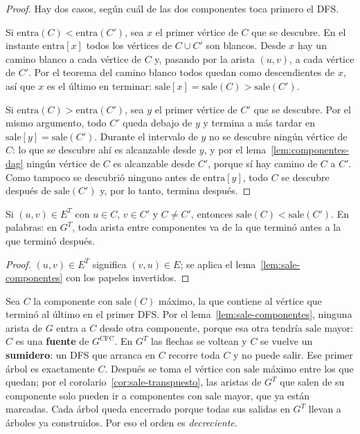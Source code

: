 \documentclass[11pt,letterpaper]{article}
\begin{document}
\begin{proof}
  Hay dos casos, según cuál de las dos componentes toca primero el
  DFS.

  Si $\text{entra}(C) < \text{entra}(C')$, sea $x$ el primer vértice
  de $C$ que se descubre. En el instante $\text{entra}[x]$ todos los
  vértices de $C \cup C'$ son blancos. Desde $x$ hay un camino blanco a
  cada vértice de $C$ y, pasando por la arista $(u, v)$, a cada vértice
  de $C'$. Por el teorema del camino blanco todos quedan como
  descendientes de $x$, así que $x$ es el último en terminar:
  $\text{sale}[x] = \text{sale}(C) > \text{sale}(C')$.

  Si $\text{entra}(C) > \text{entra}(C')$, sea $y$ el primer vértice
  de $C'$ que se descubre. Por el mismo argumento, todo $C'$ queda
  debajo de $y$ y termina a más tardar en $\text{sale}[y] =
  \text{sale}(C')$. Durante el intervalo de $y$ no se descubre ningún
  vértice de $C$: lo que se descubre ahí es alcanzable desde $y$, y por
  el lema~\ref{lem:componentes-dag} ningún vértice de $C$ es
  alcanzable desde $C'$, porque sí hay camino de $C$ a $C'$. Como
  tampoco se descubrió ninguno antes de $\text{entra}[y]$, todo $C$ se
  descubre después de $\text{sale}(C')$ y, por lo tanto, termina
  después.
\end{proof}

\begin{corolario}
  \label{cor:sale-transpuesto}
  Si $(u, v) \in E^T$ con $u \in C$, $v \in C'$ y $C \neq C'$,
  entonces $\text{sale}(C) < \text{sale}(C')$. En palabras: en $G^T$,
  toda arista entre componentes va de la que terminó antes a la que
  terminó después.
\end{corolario}

\begin{proof}
  $(u, v) \in E^T$ significa $(v, u) \in E$; se aplica el
  lema~\ref{lem:sale-componentes} con los papeles invertidos.
\end{proof}

\begin{idea}
  Sea $C$ la componente con $\text{sale}(C)$ máximo, la que contiene al
  vértice que terminó al último en el primer DFS. Por el
  lema~\ref{lem:sale-componentes}, ninguna arista de $G$ entra a $C$
  desde otra componente, porque esa otra tendría $\text{sale}$ mayor:
  $C$ es una \textbf{fuente} de $G^{\text{CFC}}$. En $G^T$ las flechas
  se voltean y $C$ se vuelve un \textbf{sumidero}: un DFS que arranca
  en $C$ recorre toda $C$ y no puede salir. Ese primer árbol es
  exactamente $C$. Después se toma el vértice con $\text{sale}$ máximo
  entre los que quedan; por el corolario~\ref{cor:sale-transpuesto},
  las aristas de $G^T$ que salen de su componente solo pueden ir a
  componentes con $\text{sale}$ mayor, que ya están marcadas. Cada
  árbol queda encerrado porque todas sus salidas en $G^T$ llevan a
  árboles ya construidos. Por eso el orden es \emph{decreciente}.
\end{idea}
\end{document}

